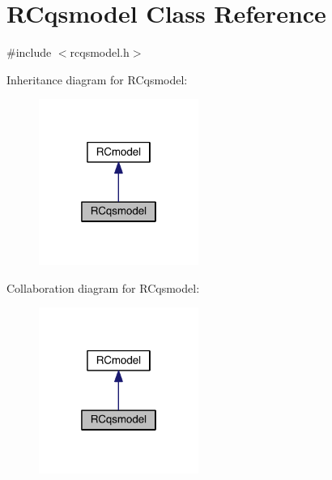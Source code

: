 \hypertarget{class_r_cqsmodel}{}\section{R\+Cqsmodel Class Reference}
\label{class_r_cqsmodel}


{\ttfamily \#include $<$rcqsmodel.\+h$>$}



Inheritance diagram for R\+Cqsmodel\+:\nopagebreak
\begin{figure}[H]
\begin{center}
\leavevmode
\includegraphics[width=148pt]{d4/dee/class_r_cqsmodel__inherit__graph}
\end{center}
\end{figure}


Collaboration diagram for R\+Cqsmodel\+:\nopagebreak
\begin{figure}[H]
\begin{center}
\leavevmode
\includegraphics[width=148pt]{d5/d67/class_r_cqsmodel__coll__graph}
\end{center}
\end{figure}
